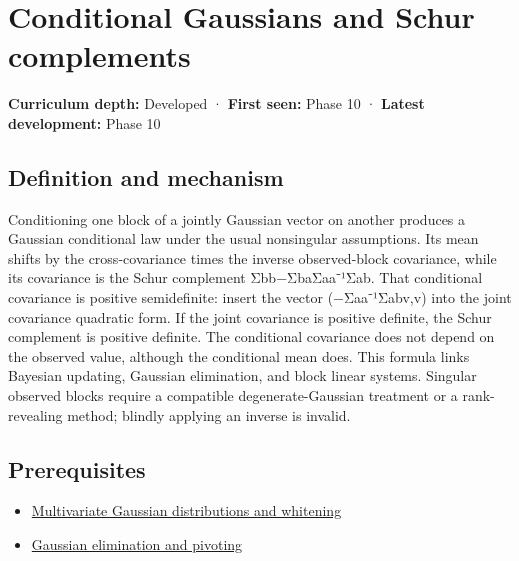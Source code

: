 \hypertarget{appendix-f0437ea55a47}{}\label{referencestart:appendix-f0437ea55a47}
\section{Conditional Gaussians and Schur complements}\label{appendix-f0437ea55a47-conditional-gaussians-and-schur-complements}

\textbf{Curriculum depth:} Developed · \textbf{First seen:} Phase 10 · \textbf{Latest development:} Phase 10

\begin{allmightroledefinition}

\subsection{Definition and mechanism}\label{appendix-f0437ea55a47-definition-and-mechanism}

Conditioning one block of a jointly Gaussian vector on another produces a Gaussian conditional law under the usual nonsingular assumptions. Its mean shifts by the cross-covariance times the inverse observed-block covariance, while its covariance is the Schur complement Σbb−ΣbaΣaa⁻¹Σab. That conditional covariance is positive semidefinite: insert the vector (−Σaa⁻¹Σabv,v) into the joint covariance quadratic form. If the joint covariance is positive definite, the Schur complement is positive definite. The conditional covariance does not depend on the observed value, although the conditional mean does. This formula links Bayesian updating, Gaussian elimination, and block linear systems. Singular observed blocks require a compatible degenerate-Gaussian treatment or a rank-revealing method; blindly applying an inverse is invalid.

\end{allmightroledefinition}

\subsection{Prerequisites}\label{appendix-f0437ea55a47-prerequisites}

\begin{itemize}
\tightlist
\item
  \hyperref[appendix-12bbe185dbe5]{Multivariate Gaussian distributions and whitening}
\item
  \hyperref[appendix-f6e77f4a200f]{Gaussian elimination and pivoting}
\end{itemize}

